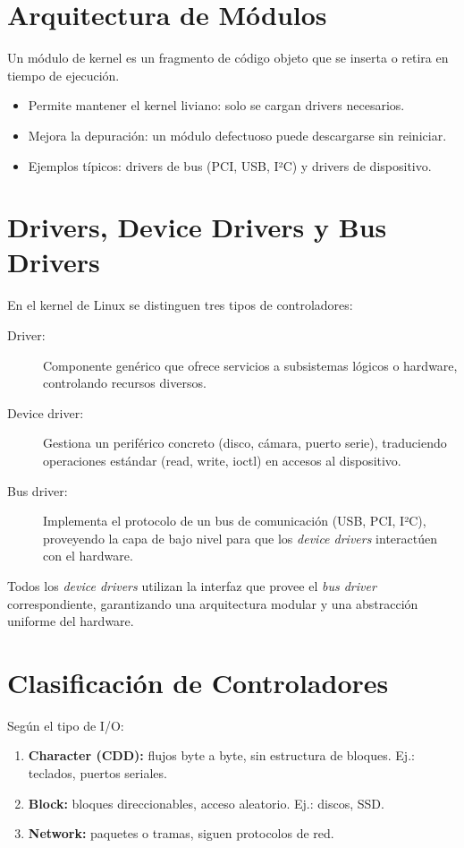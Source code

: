 \section{Arquitectura de Módulos}
Un módulo de kernel es un fragmento de código objeto que se inserta o retira en tiempo de ejecución.  
\begin{itemize}
  \item Permite mantener el kernel liviano: solo se cargan drivers necesarios.
  \item Mejora la depuración: un módulo defectuoso puede descargarse sin reiniciar.
  \item Ejemplos típicos: drivers de bus (PCI, USB, I²C) y drivers de dispositivo.
\end{itemize}

\section{Drivers, Device Drivers y Bus Drivers}

En el kernel de Linux se distinguen tres tipos de controladores:

\begin{description}
  \item[Driver:] Componente genérico que ofrece servicios a subsistemas lógicos o hardware, controlando recursos diversos.
  \item[Device driver:] Gestiona un periférico concreto (disco, cámara, puerto serie), traduciendo operaciones estándar (read, write, ioctl) en accesos al dispositivo.
  \item[Bus driver:] Implementa el protocolo de un bus de comunicación (USB, PCI, I²C), proveyendo la capa de bajo nivel para que los \emph{device drivers} interactúen con el hardware.
\end{description}

\noindent Todos los \emph{device drivers} utilizan la interfaz que provee el \emph{bus driver} correspondiente, garantizando una arquitectura modular y una abstracción uniforme del hardware.


\section{Clasificación de Controladores}
Según el tipo de I/O:
\begin{enumerate}
  \item \textbf{Character (CDD):} flujos byte a byte, sin estructura de bloques. Ej.: teclados, puertos seriales.
  \item \textbf{Block:} bloques direccionables, acceso aleatorio. Ej.: discos, SSD.
  \item \textbf{Network:} paquetes o tramas, siguen protocolos de red.
\end{enumerate}

